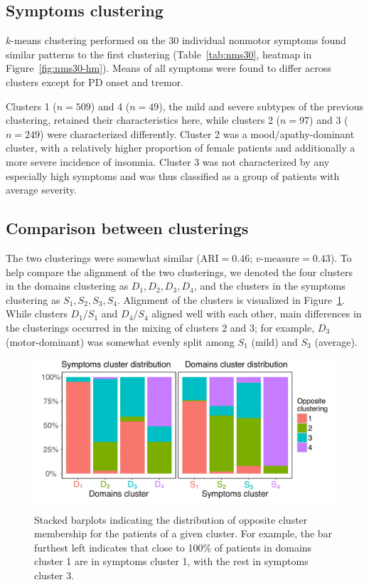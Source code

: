 \documentclass[preprint,5p]{elsarticle} %
\begin{document}
\subsection{Symptoms clustering}

$k$-means clustering performed on the 30 individual nonmotor symptoms found similar patterns to the
first clustering (Table~\ref{tab:nms30}, heatmap in Figure~\ref{fig:nms30-hm}). Means of all
symptoms were found to differ across clusters except for PD onset and tremor.

Clusters 1 ($n = 509$) and 4 ($n = 49$), the mild and severe subtypes of the previous clustering,
retained their characteristics here, while clusters 2 ($n = 97$) and 3 ($n = 249$) were
characterized differently.
Cluster 2 was a mood/apathy-dominant cluster, with a relatively higher proportion of female patients and
additionally a more severe incidence of insomnia. Cluster 3 was not characterized by any especially high
symptoms and was thus classified as a group of patients with average severity.

\subsection{Comparison between clusterings}

 The two clusterings were somewhat similar ($\text{ARI} = 0.46$; $\text{$v$-measure} = 0.43$).  To
 help compare the alignment of the two clusterings, we denoted the four clusters in the domains
 clustering as $D_1, D_2, D_3, D_4$, and the clusters in the symptoms clustering as $S_1, S_2, S_3,
 S_4$.
Alignment of the clusters is visualized in Figure~\ref{fig:align}. While clusters $D_1/S_1$ and
$D_4/S_4$
aligned well with each other, main differences in the clusterings occurred in the mixing of
clusters 2 and 3; for example, $D_3$ (motor-dominant) was somewhat
evenly split among $S_1$ (mild) and $S_3$ (average).

\begin{figure}[H]
  \centering
  \includegraphics[width=\linewidth]{cluster-alignment.pdf}
  \caption{Stacked barplots indicating the distribution of opposite cluster membership for the patients of
  a given cluster. For example, the bar furthest left indicates that close to 100\% of patients in
domains cluster 1 are in symptoms cluster 1, with the rest in symptoms cluster 3.}
  \label{fig:align}
\end{figure}
\end{document}
